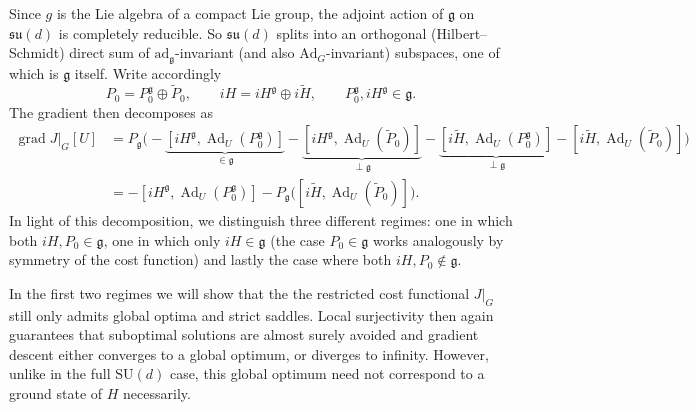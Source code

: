 \documentclass{article}
\begin{document}
Since \(g\) is the Lie algebra of a compact Lie group, the adjoint action of \(\mathfrak{g}\) on \(\mathfrak{su}(d)\) is completely reducible.
So $\mathfrak{su}(d)$ splits into an orthogonal (Hilbert--Schmidt) direct sum of $\mathrm{ad}_{\mathfrak{g}}$-invariant (and also \(\mathrm{Ad}_G\)-invariant) subspaces, one of which is $\mathfrak g$ itself. Write accordingly
\begin{equation}
P_0 = P_0^{\mathfrak g} \oplus \tilde P_0, \qquad iH = iH^{\mathfrak{g}} \oplus i \tilde{H}, \qquad P_0^{\mathfrak g}, iH^{\mathfrak{g}} \in \mathfrak g.
\end{equation}
The gradient then decomposes as
\begin{align}
    \operatorname{grad} J\vert_G[U] &= P_{\mathfrak{g}} \big(- \underbrace{[iH^{\mathfrak{g}}, \operatorname{Ad}_U(P_0^{\mathfrak g})]}_{\in \mathfrak{g}} - \underbrace{[iH^{\mathfrak{g}}, \operatorname{Ad}_U(\tilde{P}_0)]}_{\perp \mathfrak{g}} - \underbrace{[i \tilde{H}, \operatorname{Ad}_U(P_0^{\mathfrak g})]}_{\perp \mathfrak{g}} - [i \tilde{H}, \operatorname{Ad}_U(\tilde{P}_0)]\big) \nonumber \\
    \label{eq:gradient_isotypcial_decomposition}
    &= - [iH^{\mathfrak{g}}, \operatorname{Ad}_U(P_0^{\mathfrak g})] - P_{\mathfrak{g}} \big( [i \tilde{H}, \operatorname{Ad}_U(\tilde{P}_0)]\big).
\end{align}
In light of this decomposition, we distinguish three different regimes: one in which both \(iH, P_0 \in \mathfrak{g}\), one in which only \(iH \in \mathfrak{g}\) (the case \(P_0 \in \mathfrak{g}\) works analogously by symmetry of the cost function) and lastly the case where both  \(iH, P_0 \notin \mathfrak{g}\).

In the first two regimes we will show that the the restricted cost functional \(J\vert_G\) still only admits global optima and strict saddles.
Local surjectivity then again guarantees that suboptimal solutions are almost surely avoided and gradient descent either converges to a global optimum, or diverges to infinity.
However, unlike in the full \(\mathrm{SU}(d)\) case, this global optimum need not correspond to a ground state of \(H\) necessarily.
\end{document}
